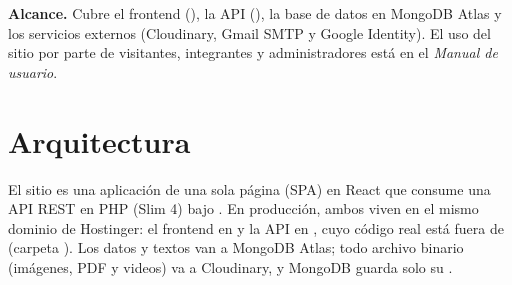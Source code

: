 \documentclass[11pt,a4paper]{article}
\begin{document}
\textbf{Alcance.} Cubre el frontend (), la API (), la base de datos en MongoDB Atlas y los
servicios externos (Cloudinary, Gmail SMTP y Google Identity). El uso del sitio por parte de visitantes, integrantes y
administradores est\'a en el \emph{Manual de usuario}.

\section{Arquitectura}

El sitio es una aplicaci\'on de una sola p\'agina (SPA) en React que consume una API REST en PHP (Slim 4) bajo
. En producci\'on, ambos viven en el mismo dominio de Hostinger: el frontend en  y la
API en , cuyo c\'odigo real est\'a fuera de  (carpeta ). Los datos
y textos van a MongoDB Atlas; todo archivo binario (im\'agenes, PDF y videos) va a Cloudinary, y MongoDB guarda solo
su .
\end{document}
